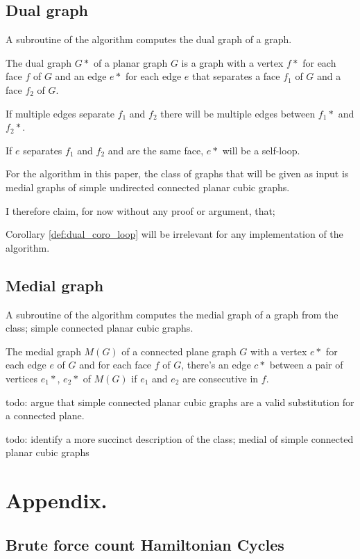 \documentclass{article}
\begin{document}
	\subsection{Dual graph}

		A subroutine of the algorithm computes the dual graph of a graph.
		
		\begin{definition}
			The dual graph $G*$ of a planar graph $G$ is a graph with a vertex $f*$ for each face $f$ of $G$ and an edge $e*$ for each edge $e$ that separates a face $f_1$ of $G$ and a face $f_2$ of $G$.
		\end{definition}
		
		\begin{corollary}
			If multiple edges separate $f_1$ and $f_2$ there will be multiple edges between $f_1*$ and $f_2*$.
		\end{corollary}
		
		\begin{corollary}\label{def:dual_coro_loop}
			If $e$ separates $f_1$ and $f_2$ and are the same face, $e*$ will be a self-loop.
		\end{corollary}
		
		For the algorithm in this paper, the class of graphs that will be given as input is medial graphs of simple undirected connected planar cubic graphs.
		
		I therefore claim, for now without any proof or argument, that; 
		
		\begin{claim}
			Corollary \ref{def:dual_coro_loop} will be irrelevant for any implementation of the algorithm.
		\end{claim}

	\subsection{Medial graph}
		
		A subroutine of the algorithm computes the medial graph of a graph from the class; simple connected planar cubic graphs.
		
		\begin{definition}
			The medial graph $M(G)$ of a connected plane graph $G$ with a vertex $e*$ for each edge $e$ of $G$ and for each face $f$ of $G$, there's an edge $c*$ between a pair of vertices $e_1*$, $e_2*$ of $M(G)$ if $e_1$ and $e_2$ are consecutive in $f$.
		\end{definition}
		
		todo: argue that simple connected planar cubic graphs are a valid substitution for a connected plane.
		
		todo: identify a more succinct description of the class; medial of simple connected planar cubic graphs
		
\section{Appendix.}

\subsection{Brute force count Hamiltonian Cycles}\label{appx:brute-force-count-ham-cyc}
\end{document}
